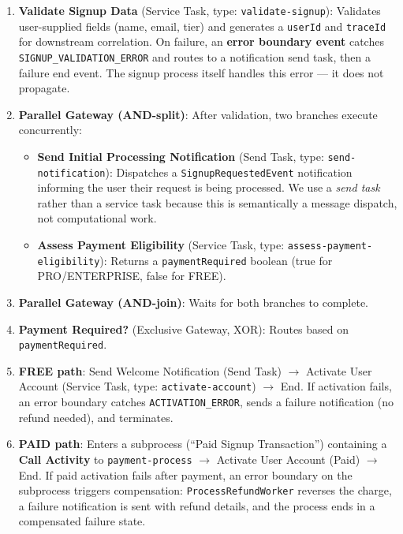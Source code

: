 \documentclass[10pt,a4paper]{article}
\begin{document}
\begin{enumerate}
    \item \textbf{Validate Signup Data} (Service Task, type: \texttt{validate-signup}): Validates user-supplied fields (name, email, tier) and generates a \texttt{userId} and \texttt{traceId} for downstream correlation. On failure, an \textbf{error boundary event} catches \texttt{SIGNUP\_VALIDATION\_ERROR} and routes to a notification send task, then a failure end event. The signup process itself handles this error --- it does not propagate.

    \item \textbf{Parallel Gateway (AND-split)}: After validation, two branches execute concurrently:
    \begin{itemize}
        \item \textbf{Send Initial Processing Notification} (Send Task, type: \texttt{send-notification}): Dispatches a \texttt{SignupRequestedEvent} notification informing the user their request is being processed. We use a \emph{send task} rather than a service task because this is semantically a message dispatch, not computational work.
        \item \textbf{Assess Payment Eligibility} (Service Task, type: \texttt{assess-payment-eligibility}): Returns a \texttt{paymentRequired} boolean (true for PRO/ENTERPRISE, false for FREE).
    \end{itemize}

    \item \textbf{Parallel Gateway (AND-join)}: Waits for both branches to complete.

    \item \textbf{Payment Required?} (Exclusive Gateway, XOR): Routes based on \texttt{paymentRequired}.

    \item \textbf{FREE path}: Send Welcome Notification (Send Task) $\rightarrow$ Activate User Account (Service Task, type: \texttt{activate-account}) $\rightarrow$ End. If activation fails, an error boundary catches \texttt{ACTIVATION\_ERROR}, sends a failure notification (no refund needed), and terminates.

    \item \textbf{PAID path}: Enters a subprocess (``Paid Signup Transaction'') containing a \textbf{Call Activity} to \texttt{payment-process} $\rightarrow$ Activate User Account (Paid) $\rightarrow$ End. If paid activation fails after payment, an error boundary on the subprocess triggers compensation: \texttt{ProcessRefundWorker} reverses the charge, a failure notification is sent with refund details, and the process ends in a compensated failure state.
\end{enumerate}
\end{document}
